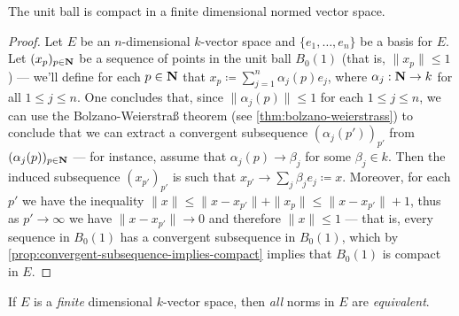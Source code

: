 \begin{corollary}
\label{cor:unit-ball}
The unit ball is compact in a finite dimensional normed vector space.
\end{corollary}

\begin{proof}
Let \(E\) be an \(n\)-dimensional \(k\)-vector space and \(\{e_1, \dots, e_n\}\)
be a basis for \(E\). Let \((x_p)_{p \in \mathbf{N}}\) be a sequence of points in the
unit ball \(B_0(1)\) (that is, \(\| x_{p} \| \leq 1\)) --- we'll define for
each \(p \in \mathbf{N}\) that \(x_p \coloneq \sum_{j=1}^{n} \alpha_j(p) e_j\), where
\(\alpha_j: \mathbf{N} \to k\) for all \(1 \leq j \leq n\). One concludes that, since
\(\| \alpha_j(p) \| \leq 1\) for each \(1 \leq j \leq n\), we can use the
Bolzano-Weierstra{\ss} theorem (see \cref{thm:bolzano-weierstrass}) to conclude
that we can extract a convergent subsequence \((\alpha_j(p'))_{p'}\) from
\((\alpha_j(p))_{p \in \mathbf{N}}\) --- for instance, assume that \(\alpha_j(p) \to
\beta_j\) for some \(\beta_j \in k\). Then the induced subsequence
\((x_{p'})_{p'}\) is such that \(x_{p'} \to \sum_j \beta_j e_j \coloneq
x\). Moreover, for each \(p'\) we have the inequality \(\| x \| \leq \| x -
x_{p'} \| + \| x_{p} \| \leq \| x - x_{p'} \| + 1\), thus as \(p' \to \infty\)
we have \(\| x - x_{p'} \| \to 0\) and therefore \(\| x \| \leq 1\) --- that
is, every sequence in \(B_0(1)\) has a convergent subsequence in \(B_0(1)\),
which by \cref{prop:convergent-subsequence-implies-compact} implies that
\(B_0(1)\) is compact in \(E\).
\end{proof}

\begin{lemma}
\label{lem:finite-dim-equivalent-norms}
If \(E\) is a \emph{finite} dimensional \(k\)-vector space, then \emph{all}
norms in \(E\) are \emph{equivalent}.
\end{lemma}

